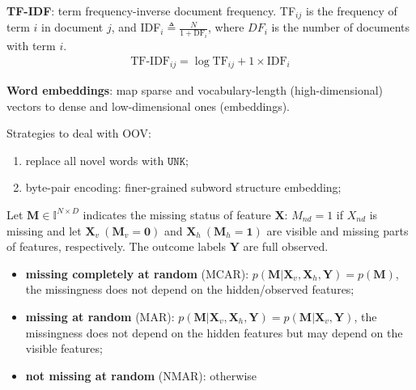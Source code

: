 \textbf{TF-IDF}: term frequency-inverse document frequency.
TF$_{ij}$ is the frequency of term $i$ in document $j$, and 
IDF$_i\triangleq{\frac{N}{1+\text{DF}_i}}$, 
where $DF_i$ is the number of documents with term $i$.
\begin{gather}
    \text{TF-IDF}_{ij}=\log{\text{TF}_{ij}+1}\times\text{IDF}_i
\end{gather}

\textbf{Word embeddings}: 
map sparse and vocabulary-length (high-dimensional) vectors to 
dense and low-dimensional ones (embeddings).

Strategies to deal with OOV:
\begin{enumerate}
    \item replace all novel words with $\mathtt{UNK}$;
    \item byte-pair encoding: finer-grained subword structure embedding;
\end{enumerate}

Let $\boldsymbol{M}\in\mathbb{I}^{N\times{D}}$ indicates the missing status of feature $\boldsymbol{X}$:
$M_{nd}=1$ if $X_{nd}$ is missing and let $\boldsymbol{X}_v~(\boldsymbol{M}_v=\boldsymbol{0})$ and 
$\boldsymbol{X}_h~(\boldsymbol{M}_h=\boldsymbol{1})$ 
are visible and missing parts of features, respectively. 
The outcome labels $\mathbf{Y}$ are full observed.
\begin{itemize}
    \item \textbf{missing completely at random} (MCAR): 
    $p(\boldsymbol{M}|\boldsymbol{X}_v,\boldsymbol{X}_h,\boldsymbol{Y})=p(\boldsymbol{M})$,
    the missingness does not depend on the hidden/observed features;
    \item \textbf{missing at random} (MAR):
    $p(\boldsymbol{M}|\boldsymbol{X}_v,\boldsymbol{X}_h,\boldsymbol{Y})
    =p(\boldsymbol{M}|\boldsymbol{X}_v,\boldsymbol{Y})$,
    the missingness does not depend on the hidden features but may depend on the visible features;
    \item \textbf{not missing at random} (NMAR): otherwise
\end{itemize}

